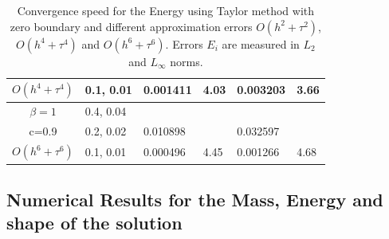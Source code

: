 \documentclass[%
 aip,
cp,  %
 amsmath,amssymb,%
 reprint,%
]{revtex4-2}
\begin{document}
\begin{table}[ht]
\begin{tabular}{||c|l|ll|ll||}
       $O(h^4+ \tau^4)$ &0.1, 0.01   &0.001411 & 4.03   & 0.003203  & 3.66  \\
    \hline
  $\beta=1$     &0.4, 0.04   &            &          &                  &      \\
      c=0.9                    &0.2, 0.02   &0.010898 &           & 0.032597      &       \\
     $O(h^6+ \tau^6)$ &0.1, 0.01 & 0.000496 &4.45 & 0.001266  & 4.68        \\
	   \hline
			\hline 
		\end{tabular}
		\caption{Convergence speed for the Energy using Taylor method with zero boundary and different approximation errors $O(h^{2} + \tau^2 )$, $O(h^{4} + \tau^4 )$ and $O(h^{6} + \tau^6 )$. Errors $E_i$ are measured in $L_2$ and $L_\infty$ norms.}
\label{tableB}
\end{table}

\subsection{Numerical Results for the Mass, Energy and shape of the solution}
\end{document}
